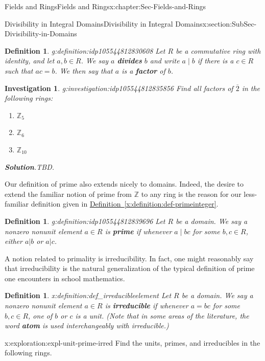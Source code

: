\documentclass[oneside,10pt,]{book}
\newcommand{\blocktitlefont}{\relax}
\newcommand{\xreffont}{\relax}
\newcommand{\terminology}[1]{\textbf{#1}}
\numberwithin{equation}{section}
\def\Z{{\mathbb Z}}
\newtheorem{definition}[theorem]{Definition}
\newtheorem{investigation}[theorem]{Investigation}
\begin{document}
\begin{chapterptx}{Fields and Rings}{}{Fields and Rings}{}{}{x:chapter:Sec-Fields-and-Rings}
\begin{sectionptx}{Divisibility in Integral Domains}{}{Divisibility in Integral Domains}{}{}{x:section:SubSec-Divisibility-in-Domains}
\begin{definition}{}{g:definition:idp105544812830608}%
%
%
Let \(R\) be a commutative ring with identity, and let \(a,b\in R\). We say \(a\) \terminology{divides} \(b\) and write \(a\mid b\) if there is a \(c\in R\) such that \(ac = b\). We then say that \(a\) is a \terminology{factor} of \(b\).%
\end{definition}
\begin{investigation}{}{g:investigation:idp105544812835856}%
Find all factors of \(\overline{2}\) in the following rings:%
%
\begin{enumerate}
\item{}\(\displaystyle \Z_5\)%
\item{}\(\displaystyle \Z_6\)%
\item{}\(\displaystyle \Z_{10}\)%
\end{enumerate}
\par\smallskip%
\noindent\textbf{\blocktitlefont Solution}.\hypertarget{g:solution:idp105544812838288}{}\quad{}TBD.%
\end{investigation}%
Our definition of prime also extends nicely to domains. Indeed, the desire to extend the familiar notion of prime from \(\Z\) to any ring is the reason for our less-familiar definition given in \hyperref[x:definition:def-primeinteger]{Definition~{\xreffont\ref{x:definition:def-primeinteger}}}.%
\begin{definition}{}{g:definition:idp105544812839696}%
Let \(R\) be a domain. We say a nonzero nonunit element \(a\in R\) is \terminology{prime} if whenever \(a\mid bc\) for some \(b,c\in R\), either \(a|b\) or \(a|c\).%
\end{definition}
A notion related to primality is irreducibility. In fact, one might reasonably say that irreducibility is the natural generalization of the typical definition of prime one encounters in school mathematics.%
\begin{definition}{}{x:definition:def_irreducibleelement}%
%
%
Let \(R\) be a domain. We say a nonzero nonunit element \(a\in R\) is \terminology{irreducible} if whenever \(a = bc\) for some \(b,c\in R\), one of \(b\) or \(c\) is a unit. (Note that in some areas of the literature, the word \terminology{atom} is used interchangeably with irreducible.)%
\end{definition}
\begin{exploration}{}{x:exploration:expl-unit-prime-irred}%
Find the units, primes, and irreducibles in the following rings.%

\end{exploration}
\end{sectionptx}
\end{chapterptx}
\end{document}
